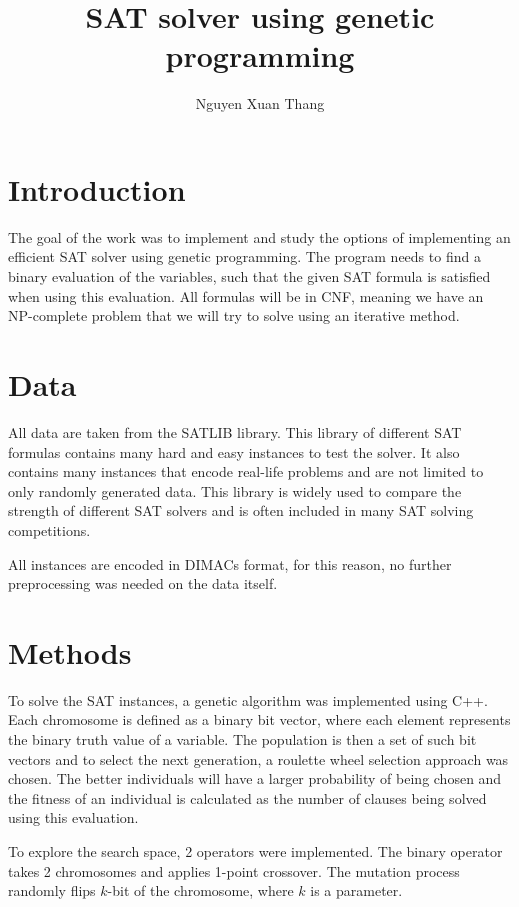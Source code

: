 \documentclass[czech]{mvi-report}
\title{SAT solver using genetic programming}
\author{Nguyen Xuan Thang}
\affiliation{CTU - FIT}
\begin{document}
\maketitle

\section{Introduction}
The goal of the work was to implement and study the options of implementing an efficient SAT solver using genetic programming. The program needs to find a binary evaluation of the variables, such that the given SAT formula is satisfied when using this evaluation. All formulas will be in CNF, meaning we have an NP-complete problem that we will try to solve using an iterative method.


\section{Data}
All data are taken from the SATLIB library. This library of different SAT formulas contains many hard and easy instances to test the solver. It also contains many instances that encode real-life problems and are not limited to only randomly generated data. This library is widely used to compare the strength of different SAT solvers and is often included in many SAT solving competitions.

All instances are encoded in DIMACs format, for this reason, no further preprocessing was needed on the data itself.



\section{Methods}
To solve the SAT instances, a genetic algorithm was implemented using C++. Each chromosome is defined as a binary bit vector, where each element represents the binary truth value of a variable.
The population is then a set of such bit vectors and to select the next generation, a roulette wheel selection approach was chosen. The better individuals will have a larger probability of being chosen and the fitness of an individual is calculated as the number of clauses being solved using this evaluation.

To explore the search space, 2 operators were implemented. The binary operator takes 2 chromosomes and applies 1-point crossover.
The mutation process randomly flips $k$-bit of the chromosome, where $k$ is a parameter.
\end{document}
